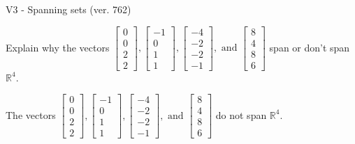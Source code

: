 \begin{exercise}
  \begin{exerciseTitle}V3 - Spanning sets (ver. 762)\end{exerciseTitle}
  \begin{exerciseStatement}
    Explain why the vectors \(\left[\begin{array}{r}
0 \\
0 \\
2 \\
2
\end{array}\right] , \left[\begin{array}{r}
-1 \\
0 \\
1 \\
1
\end{array}\right] , \left[\begin{array}{r}
-4 \\
-2 \\
-2 \\
-1
\end{array}\right] , \text{ and } \left[\begin{array}{r}
8 \\
4 \\
8 \\
6
\end{array}\right]\) span or don't span \(\mathbb{R}^4\). 
	


  \end{exerciseStatement}
  \begin{exerciseAnswer}
   The vectors \(\left[\begin{array}{r}
0 \\
0 \\
2 \\
2
\end{array}\right] , \left[\begin{array}{r}
-1 \\
0 \\
1 \\
1
\end{array}\right] , \left[\begin{array}{r}
-4 \\
-2 \\
-2 \\
-1
\end{array}\right] , \text{ and } \left[\begin{array}{r}
8 \\
4 \\
8 \\
6
\end{array}\right]\) 
  	 do not  
	span \(\mathbb{R}^4\).
  


  \end{exerciseAnswer}
\end{exercise}